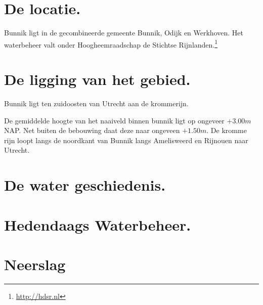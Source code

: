 \section{De locatie.}
Bunnik ligt in de gecombineerde gemeente Bunnik, Odijk en Werkhoven.
Het waterbeheer valt onder Hoogheemraadschap de Stichtse Rijnlanden.\footnote{\url{http://hdsr.nl}}

\section{De ligging van het gebied.}
Bunnik ligt ten zuidoosten van Utrecht aan de krommerijn.

De gemiddelde hoogte van het naaiveld binnen bunnik ligt op ongeveer $+3.00 m$ NAP.
Net buiten de bebouwing daat deze naar ongeveen $+1.50 m$.
De kromme rijn loopt langs de noordkant van Bunnik langs Amelisweerd en Rijnouen naar Utrecht.

\section{De water geschiedenis.}
\section{Hedendaags Waterbeheer.}
\section{Neerslag}
